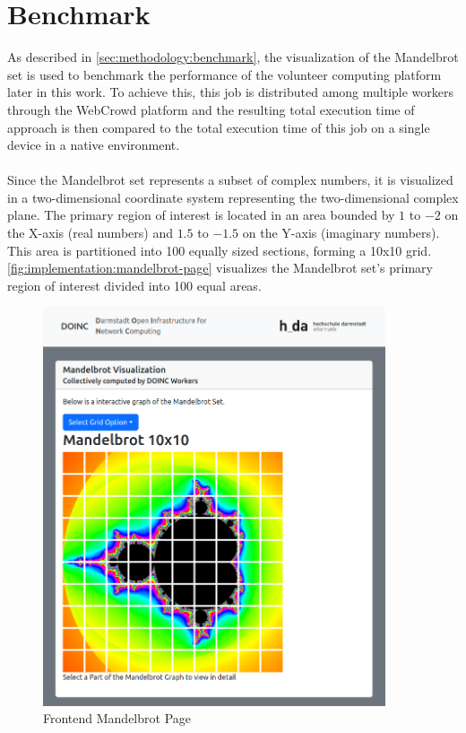 \section{Benchmark}
\label{sec:implementation:benchmark}
As described in \autoref{sec:methodology:benchmark}, the visualization of the Mandelbrot set is used to benchmark the performance of the volunteer computing platform later in this work. To achieve this, this job is distributed among multiple workers through the WebCrowd platform and the resulting total execution time of approach is then compared to the total execution time of this job on a single device in a native environment.
\\~\\
Since the Mandelbrot set represents a subset of complex numbers, it is visualized in a two-dimensional coordinate system representing the two-dimensional complex plane. The primary region of interest is located in an area bounded by $1$ to $-2$ on the X-axis (real numbers) and $1.5$ to $-1.5$ on the Y-axis (imaginary numbers). This area is partitioned into 100 equally sized sections, forming a 10x10 grid. \autoref{fig:implementation:mandelbrot-page} visualizes the Mandelbrot set's primary region of interest divided into 100 equal areas. 
\begin{figure}[htbp]
    \centering
    \includegraphics[width=0.9\textwidth]{gfx/figures/mandelbrot-page.png}
    \caption{Frontend Mandelbrot Page}
    \label{fig:implementation:mandelbrot-page}
\end{figure}
